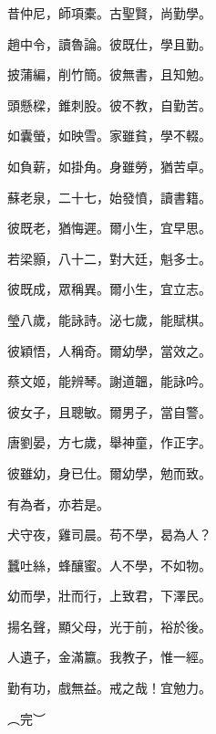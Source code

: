 \documentclass[20pt,a4paper]{article}
\begin{document}
\begin{huge}

昔仲尼，師項橐。古聖賢，尚勤學。

趙中令，讀魯論。彼既仕，學且勤。

披蒲編，削竹簡。彼無書，且知勉。

頭懸樑，錐刺股。彼不教，自勤苦。

如囊螢，如映雪。家雖貧，學不輟。

如負薪，如掛角。身雖勞，猶苦卓。

蘇老泉，二十七，始發憤，讀書籍。

彼既老，猶悔遲。爾小生，宜早思。

若梁顥，八十二，對大廷，魁多士。

彼既成，眾稱異。爾小生，宜立志。

瑩八歲，能詠詩。泌七歲，能賦棋。

彼穎悟，人稱奇。爾幼學，當效之。

蔡文姬，能辨琴。謝道韞，能詠吟。

彼女子，且聰敏。爾男子，當自警。

唐劉晏，方七歲，舉神童，作正字。

彼雖幼，身已仕。爾幼學，勉而致。

有為者，亦若是。
\newpage

犬守夜，雞司晨。苟不學，曷為人？

蠶吐絲，蜂釀蜜。人不學，不如物。

幼而學，壯而行，上致君，下澤民。

揚名聲，顯父母，光于前，裕於後。

人遺子，金滿籝。我教子，惟一經。

勤有功，戲無益。戒之哉！宜勉力。

︵完︶

\end{huge}
\end{document}
